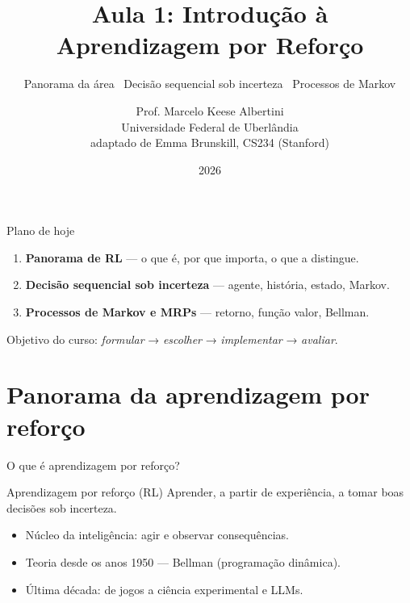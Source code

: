 \documentclass[aspectratio=169, 11pt]{beamer}
\title[Aula 1 — Introdução à RL]{Aula 1: Introdução à\\ Aprendizagem por Reforço}
\subtitle[Aprendizagem por Reforço]{Panorama da área \textbullet\ Decisão sequencial sob incerteza \textbullet\ Processos de Markov}
\author[Prof. Marcelo K. Albertini]{Prof. Marcelo Keese Albertini \\
  \footnotesize Universidade Federal de Uberlândia \\
  \footnotesize adaptado de Emma Brunskill, CS234 (Stanford)}
\institute{Universidade Federal de Uberlândia}
\date{2026}
\begin{document}
\begin{frame}\titlepage\end{frame}

\begin{frame}{Plano de hoje}
  \begin{enumerate}
    \item \textbf{Panorama de RL} — o que é, por que importa, o que a distingue.
    \item \textbf{Decisão sequencial sob incerteza} — agente, história, estado, Markov.
    \item \textbf{Processos de Markov e MRPs} — retorno, função valor, Bellman.
  \end{enumerate}

  \bigskip
  \begin{ideiabox}
    Objetivo do curso: \emph{formular} → \emph{escolher} → \emph{implementar} → \emph{avaliar}.
  \end{ideiabox}
\end{frame}

\section{Panorama da aprendizagem por reforço}

\begin{frame}{O que é aprendizagem por reforço?}
  \begin{defbox}{Aprendizagem por reforço (RL)}
    Aprender, a partir de \alert{experiência}, a tomar \alert{boas decisões} sob \alert{incerteza}.
  \end{defbox}

  \begin{itemize}
    \item Núcleo da inteligência: agir e observar consequências.
    \item Teoria desde os anos 1950 — Bellman (programação dinâmica).
    \item Última década: de jogos a ciência experimental e LLMs.
  \end{itemize}
\end{frame}
\end{document}
